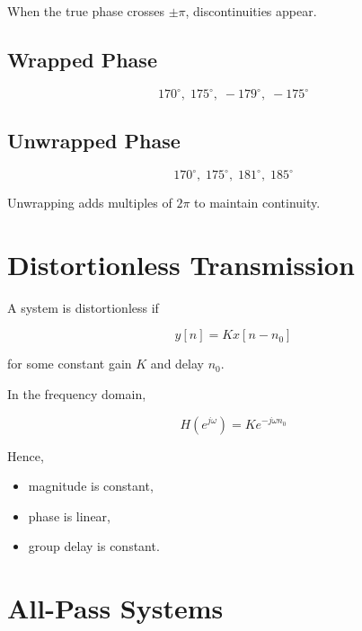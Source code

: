 When the true phase crosses \(\pm\pi\), discontinuities appear.


\subsection{Wrapped Phase}

\[
170^\circ,\;175^\circ,\;-179^\circ,\;-175^\circ
\]


\subsection{Unwrapped Phase}

\[
170^\circ,\;175^\circ,\;181^\circ,\;185^\circ
\]

Unwrapping adds multiples of \(2\pi\) to maintain continuity.


\section{Distortionless Transmission}

A system is distortionless if

\[
\boxed{
y[n]=Kx[n-n_0]
}
\]

for some constant gain \(K\) and delay \(n_0\).

In the frequency domain,

\[
\boxed{
H(e^{j\omega})=
Ke^{-j\omega n_0}
}
\]

Hence,

\begin{itemize}
\item magnitude is constant,
\item phase is linear,
\item group delay is constant.
\end{itemize}


\section{All-Pass Systems}

